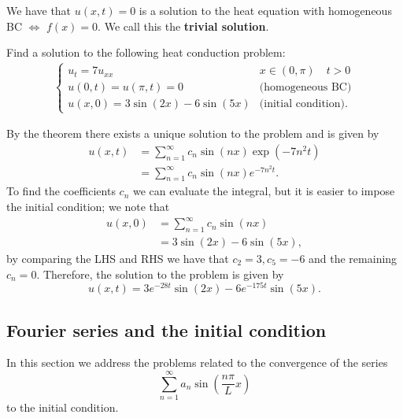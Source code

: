 \documentclass[12pt, a4paper]{article}
\begin{document}
\begin{corollary}
    We have that \(u(x,t)=0\) is a solution to the heat equation with homogeneous BC \(\iff\) \(f(x)=0\). We call this the \textbf{trivial solution}.
\end{corollary}

\begin{mdexample}
    Find a solution to the following heat conduction problem:
    \[\begin{aligned}
        \begin{cases}
            u_t = 7u_{xx} & x \in (0,\pi)\quad t>0 \\
            u(0,t)=u(\pi,t)= 0 & \text{(homogeneous BC)}\\
            u(x,0)=3\sin(2x)-6\sin(5x) & \text{(initial condition)}.
        \end{cases}
    \end{aligned}\]
    \begin{solution}
        By the theorem there exists a unique solution to the problem and is given by 
        \[\begin{aligned}
            u(x,t) &= \sum_{n=1}^{\infty} c_n \sin(n x) \exp(-7n^2 t) \\
            &=\sum_{n=1}^{\infty} c_n \sin(n x) e^{-7n^2 t}.
        \end{aligned}\]
        To find the coefficients \(c_n\) we can evaluate the integral, but it is easier to impose the initial condition; we note that 
        \[\begin{aligned}
            u(x,0) &= \sum_{n=1}^{\infty} c_n \sin(nx) \\
            &= 3\sin(2x)-6\sin(5x),
        \end{aligned}\]
        by comparing the LHS and RHS we have that \(c_2 =3 , c_5 =-6\) and the remaining \(c_n =0\). Therefore, the solution to the problem is given by 
        \[u(x,t)= 3e^{-28t}\sin(2x)-6e^{-175t}\sin(5x).\]
    \end{solution}
\end{mdexample}

\subsection{Fourier series and the initial condition}

In this section we address the problems related to the convergence of the series 
\[\sum_{n=1}^{\infty} a_n \sin \left( \frac{n\pi}{L} x\right)\]
to the initial condition.
\end{document}
